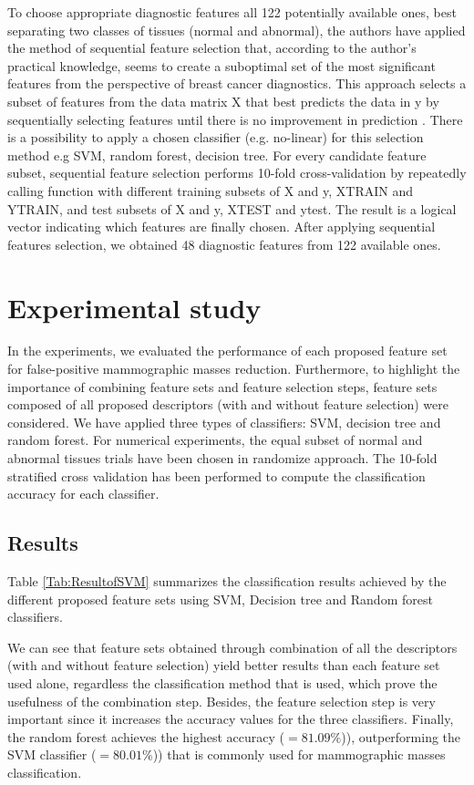 \documentclass[review,12pt]{elsarticle}
\begin{document}
To choose appropriate diagnostic features all 122 potentially available ones, best separating two classes of tissues (normal and abnormal), the authors have applied the method of sequential feature selection that, according to the author's practical knowledge, seems to create a suboptimal set of the most significant features from the perspective of breast cancer diagnostics. This approach selects a subset of features from the data matrix X that best predicts the data in y by sequentially selecting features until there is no improvement in prediction \citep{Matlab2015}. There is a possibility to apply a  chosen classifier (e.g. no-linear) for this selection method e.g SVM, random forest, decision tree. For every candidate feature subset, sequential feature selection performs 10-fold cross-validation by repeatedly calling function with different training subsets of X and y, XTRAIN and YTRAIN, and test subsets of X and y, XTEST and ytest. The result is  a logical vector indicating which features are finally chosen. After applying sequential features selection, we obtained 48 diagnostic features from 122 available ones.

\section{Experimental study}
In the experiments, we evaluated the performance of each proposed feature set for false-positive mammographic masses reduction. Furthermore, to highlight the importance of combining feature sets and feature selection steps, feature sets composed of all proposed descriptors (with and without feature selection) were considered.
 We have applied three types of classifiers: SVM, decision tree and random forest. For numerical experiments, the equal subset of normal and abnormal tissues trials have been chosen in randomize approach. The 10-fold stratified cross validation has been performed to compute the classification accuracy for each classifier.
 \subsection{Results}
Table \ref{Tab:ResultofSVM} summarizes the classification results achieved by the different proposed feature sets using  SVM, Decision tree and Random forest classifiers.


We can see that feature sets obtained through combination of all the descriptors (with and without feature selection) yield better results than each feature set used alone, regardless the  classification method that is used, which prove the usefulness of the combination step. Besides,  the feature selection step is very important since it increases the accuracy values for the three classifiers. Finally, the random forest achieves the highest accuracy ($= 81.09 \%$)), outperforming the SVM classifier ($= 80.01 \%$)) that is commonly used for mammographic masses classification.
\end{document}
